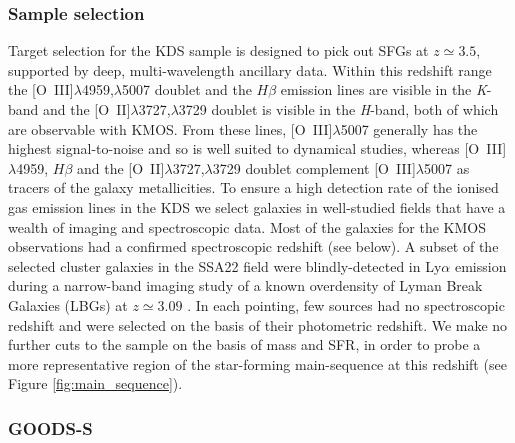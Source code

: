 \documentclass[fleqn,usenatbib]{mnras}
\begin{document}
\subsubsection{Sample selection}\label{subsubsec:sample_selection}
Target selection for the KDS sample is designed to pick out SFGs at $z\simeq3.5$, supported by deep, multi-wavelength ancillary data.
Within this redshift range the [O~{\sc III}]$\lambda$4959,$\lambda$5007 doublet and the $H\beta$ emission lines are visible in the {\it K}-band and the [O~{\sc II}]$\lambda$3727,$\lambda$3729 doublet is visible in the {\it H}-band, both of which are observable with KMOS.
From these lines, [O~{\sc III}]$\lambda$5007 generally has the highest signal-to-noise and so is well suited to dynamical studies, whereas [O~{\sc III}]$\lambda$4959, $H\beta$ and the [O~{\sc II}]$\lambda$3727,$\lambda$3729 doublet complement [O~{\sc III}]$\lambda$5007 as tracers of the galaxy metallicities. 
To ensure a high detection rate of the ionised gas emission lines in the KDS we select galaxies in well-studied fields that have a wealth of imaging and spectroscopic data.
Most of the galaxies for the KMOS observations had a confirmed spectroscopic redshift (see below).
A subset of the selected cluster galaxies in the SSA22 field were blindly-detected in Ly$\alpha$ emission during a narrow-band imaging study of a known overdensity of Lyman Break Galaxies (LBGs) at $z\simeq3.09$ \citep{Steidel2000}.
In each pointing, few sources had no spectroscopic redshift and were selected on the basis of their photometric redshift.
We make no further cuts to the sample on the basis of mass and SFR, in order to probe a more representative region of the star-forming main-sequence at this redshift (see Figure \ref{fig:main_sequence}).

\subsubsection{GOODS-S}\label{subsubsec:sample_selection_goods}
\end{document}
